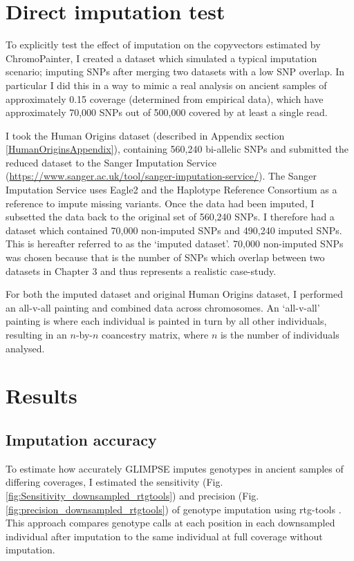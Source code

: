 \section{Direct imputation test}

To explicitly test the effect of imputation on the copyvectors estimated by ChromoPainter, I created a dataset which simulated a typical imputation scenario; imputing SNPs after merging two datasets with a low SNP overlap. In particular I did this in a way to mimic a real analysis on ancient samples of approximately 0.15 coverage (determined from empirical data), which have approximately 70,000 SNPs out of 500,000 covered by at least a single read. 

I took the Human Origins dataset (described in Appendix section \ref{HumanOriginsAppendix}), containing 560,240 bi-allelic SNPs and submitted the reduced dataset to the Sanger Imputation Service (\url{https://www.sanger.ac.uk/tool/sanger-imputation-service/}). The Sanger Imputation Service uses Eagle2 \cite{loh2016reference} and the Haplotype Reference Consortium as a reference to impute missing variants. Once the data had been imputed, I subsetted the data back to the original set of 560,240 SNPs. I therefore had a dataset which contained 70,000 non-imputed SNPs and 490,240 imputed SNPs. This is hereafter referred to as the `imputed dataset'. 70,000 non-imputed SNPs was chosen because that is the number of SNPs which overlap between two datasets in Chapter 3 and thus represents a realistic case-study. 

For both the imputed dataset and original Human Origins dataset, I performed an all-v-all painting and combined data across chromosomes. An `all-v-all' painting is where each individual is painted in turn by all other individuals, resulting in an $n$-by-$n$ coancestry matrix, where $n$ is the number of individuals analysed.


\section{Results}

\subsection{Imputation accuracy}

To estimate how accurately GLIMPSE imputes genotypes in ancient samples of differing coverages, I estimated the sensitivity (Fig. \ref{fig:Sensitivity_downsampled_rtgtools}) and precision (Fig.  \ref{fig:precision_downsampled_rtgtools}) of genotype imputation using rtg-tools \cite{cleary2014joint}. This approach compares genotype calls at each position in each downsampled individual after imputation to the same individual at full coverage without imputation.

